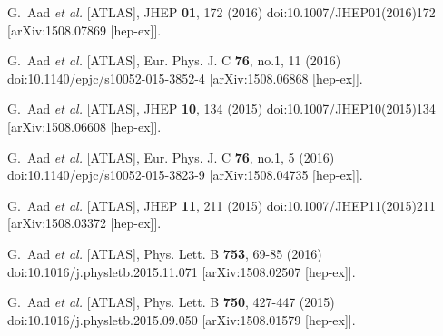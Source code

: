 \begin{thebibliography}{9}
G.~Aad \textit{et al.} [ATLAS],
JHEP \textbf{01}, 172 (2016)
doi:10.1007/JHEP01(2016)172
[arXiv:1508.07869 [hep-ex]].

G.~Aad \textit{et al.} [ATLAS],
Eur. Phys. J. C \textbf{76}, no.1, 11 (2016)
doi:10.1140/epjc/s10052-015-3852-4
[arXiv:1508.06868 [hep-ex]].

G.~Aad \textit{et al.} [ATLAS],
JHEP \textbf{10}, 134 (2015)
doi:10.1007/JHEP10(2015)134
[arXiv:1508.06608 [hep-ex]].

G.~Aad \textit{et al.} [ATLAS],
Eur. Phys. J. C \textbf{76}, no.1, 5 (2016)
doi:10.1140/epjc/s10052-015-3823-9
[arXiv:1508.04735 [hep-ex]].

G.~Aad \textit{et al.} [ATLAS],
JHEP \textbf{11}, 211 (2015)
doi:10.1007/JHEP11(2015)211
[arXiv:1508.03372 [hep-ex]].

G.~Aad \textit{et al.} [ATLAS],
Phys. Lett. B \textbf{753}, 69-85 (2016)
doi:10.1016/j.physletb.2015.11.071
[arXiv:1508.02507 [hep-ex]].

G.~Aad \textit{et al.} [ATLAS],
Phys. Lett. B \textbf{750}, 427-447 (2015)
doi:10.1016/j.physletb.2015.09.050
[arXiv:1508.01579 [hep-ex]].

\end{thebibliography}

